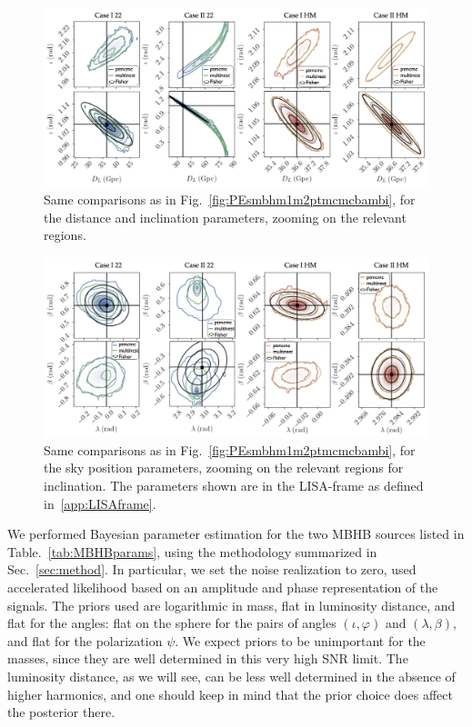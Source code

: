 \documentclass[aps,showpacs,twocolumn,prd,superscriptaddress,nofootinbib]{revtex4-1}
\begin{document}
\begin{figure}
  \centering
  \includegraphics[width=.98\linewidth]{../plots/row_Dinc_ptmcmc_bambi.png}
  \caption{Same comparisons as in Fig.~\ref{fig:PEsmbhm1m2ptmcmcbambi}, for the distance and inclination parameters, zooming on the relevant regions.}
  \label{fig:PEsmbhDincptmcmcbambi}
\end{figure}

\begin{figure}
  \centering
  \includegraphics[width=.98\linewidth]{../plots/row_sky_ptmcmc_bambi.png}
  \caption{Same comparisons as in Fig.~\ref{fig:PEsmbhm1m2ptmcmcbambi}, for the sky position parameters, zooming on the relevant regions for inclination. The parameters shown are in the LISA-frame as defined in~\ref{app:LISAframe}.}
  \label{fig:PEsmbhskyptmcmcbambi}
\end{figure}

We performed Bayesian parameter estimation for the two MBHB sources listed in Table.~\ref{tab:MBHBparams}, using the methodology summarized in Sec.~\ref{sec:method}. In particular, we set the noise realization to zero, used accelerated likelihood based on an amplitude and phase representation of the signals. The priors used are logarithmic in mass, flat in luminosity distance, and flat for the angles: flat on the sphere for the pairs of angles $(\iota, \varphi)$ and $(\lambda, \beta)$, and flat for the polarization $\psi$. We expect priors to be unimportant for the masses, since they are well determined in this very high SNR limit. The luminosity distance, as we will see, can be less well determined in the absence of higher harmonics, and one should keep in mind that the prior choice does affect the posterior there.
\end{document}
